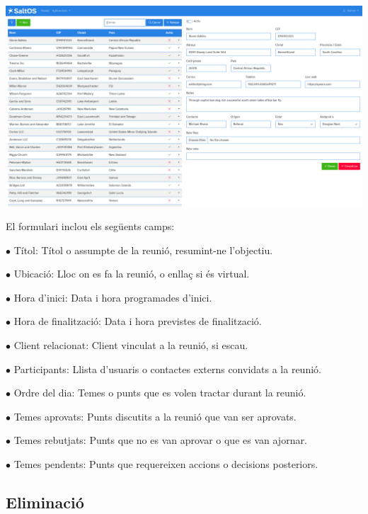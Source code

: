 \documentclass[a4paper]{article}
\begin{document}
\begin{center}\includegraphics[width=1\textwidth]{../ujest/snaps/test-screenshots-js-screenshots-crm-leads-edit-100-ca-es-1-snap.png}\end{center}

El formulari inclou els següents camps:

\begin{compactitem}
\item[\color{myblue}$\bullet$] Títol: Títol o assumpte de la reunió, resumint-ne l'objectiu.
\item[\color{myblue}$\bullet$] Ubicació: Lloc on es fa la reunió, o enllaç si és virtual.
\item[\color{myblue}$\bullet$] Hora d'inici: Data i hora programades d'inici.
\item[\color{myblue}$\bullet$] Hora de finalització: Data i hora previstes de finalització.
\item[\color{myblue}$\bullet$] Client relacionat: Client vinculat a la reunió, si escau.
\item[\color{myblue}$\bullet$] Participants: Llista d'usuaris o contactes externs convidats a la reunió.
\item[\color{myblue}$\bullet$] Ordre del dia: Temes o punts que es volen tractar durant la reunió.
\item[\color{myblue}$\bullet$] Temes aprovats: Punts discutits a la reunió que van ser aprovats.
\item[\color{myblue}$\bullet$] Temes rebutjats: Punts que no es van aprovar o que es van ajornar.
\item[\color{myblue}$\bullet$] Temes pendents: Punts que requereixen accions o decisions posteriors.
\end{compactitem}

\hypertarget{toc60}{}
\subsection{Eliminació}
\end{document}

